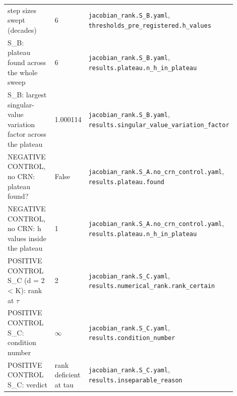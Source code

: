 \begin{longtable}{p{0.35\linewidth} p{0.14\linewidth} p{0.41\linewidth}}
step sizes swept (decades) & 6 & \texttt{\footnotesize jacobian\_\allowbreak{}rank.\allowbreak{}S\_\allowbreak{}B.\allowbreak{}yaml}, \texttt{\footnotesize thresholds\_\allowbreak{}pre\_\allowbreak{}registered.\allowbreak{}h\_\allowbreak{}values} \\
S\_B: plateau found across the whole sweep & 6 & \texttt{\footnotesize jacobian\_\allowbreak{}rank.\allowbreak{}S\_\allowbreak{}B.\allowbreak{}yaml}, \texttt{\footnotesize results.\allowbreak{}plateau.\allowbreak{}n\_\allowbreak{}h\_\allowbreak{}in\_\allowbreak{}plateau} \\
S\_B: largest singular-value variation factor across the plateau & 1.000114 & \texttt{\footnotesize jacobian\_\allowbreak{}rank.\allowbreak{}S\_\allowbreak{}B.\allowbreak{}yaml}, \texttt{\footnotesize results.\allowbreak{}singular\_\allowbreak{}value\_\allowbreak{}variation\_\allowbreak{}factor} \\
NEGATIVE CONTROL, no CRN: plateau found? & False & \texttt{\footnotesize jacobian\_\allowbreak{}rank.\allowbreak{}S\_\allowbreak{}A.\allowbreak{}no\_\allowbreak{}crn\_\allowbreak{}control.\allowbreak{}yaml}, \texttt{\footnotesize results.\allowbreak{}plateau.\allowbreak{}found} \\
NEGATIVE CONTROL, no CRN: h values inside the plateau & 1 & \texttt{\footnotesize jacobian\_\allowbreak{}rank.\allowbreak{}S\_\allowbreak{}A.\allowbreak{}no\_\allowbreak{}crn\_\allowbreak{}control.\allowbreak{}yaml}, \texttt{\footnotesize results.\allowbreak{}plateau.\allowbreak{}n\_\allowbreak{}h\_\allowbreak{}in\_\allowbreak{}plateau} \\
POSITIVE CONTROL S\_C (d = 2 < K): rank at $\tau$ & 2 & \texttt{\footnotesize jacobian\_\allowbreak{}rank.\allowbreak{}S\_\allowbreak{}C.\allowbreak{}yaml}, \texttt{\footnotesize results.\allowbreak{}numerical\_\allowbreak{}rank.\allowbreak{}rank\_\allowbreak{}certain} \\
POSITIVE CONTROL S\_C: condition number & $\infty$ & \texttt{\footnotesize jacobian\_\allowbreak{}rank.\allowbreak{}S\_\allowbreak{}C.\allowbreak{}yaml}, \texttt{\footnotesize results.\allowbreak{}condition\_\allowbreak{}number} \\
POSITIVE CONTROL S\_C: verdict & rank deficient at tau & \texttt{\footnotesize jacobian\_\allowbreak{}rank.\allowbreak{}S\_\allowbreak{}C.\allowbreak{}yaml}, \texttt{\footnotesize results.\allowbreak{}inseparable\_\allowbreak{}reason} \\
\bottomrule
\end{longtable}

